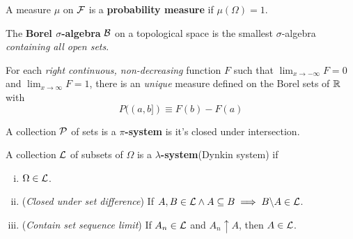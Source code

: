 \documentclass[11pt]{article}
\begin{document}
		
		\begin{definition}
			A measure $\mu$ on $\mathcal{{F}}$ is a \textbf{probability measure} if $\mu(\Omega) = 1$.
		\end{definition}
		
		\begin{definition}
			The \textbf{Borel $\sigma$-algebra} $\mathcal{{B}}$ on a topological space is the smallest $\sigma$-algebra \emph{containing all open sets}.
		\end{definition}
		
		\begin{theorem}
			For each \emph{right continuous, non-decreasing} function $F$ such that $\lim_{x \to -\infty} F = 0$ and $\lim_{x \to \infty} F = 1$, there is an \emph{unique} measure defined on the Borel sets of $\mathbb{R}$ with 
			\begin{equation}
				P((a,b]) \equiv F(b) - F(a)
			\end{equation}
		\end{theorem}
		
		\begin{definition}
			A collection $\mathcal{{P}}$ of sets is a \textbf{$\pi$-system} is it's closed under intersection.
		\end{definition}
		
		\begin{definition}
			A collection $\mathcal{{L}}$ of subsets of $\Omega$ is a \textbf{$\lambda$-system}(Dynkin system) if
			\begin{enumerate}[(i)]
				\item $\Omega \in \mathcal{{L}}$.
				\item (\emph{Closed under set difference}) If $A, B \in \mathcal{{L}} \land A \subseteq B \implies B \backslash A \in \mathcal{{L}}$.
				\item (\emph{Contain set sequence limit}) If $A_n \in \mathcal{{L}}$ and $A_n \uparrow A$, then $A \in \mathcal{{L}}$.
			\end{enumerate}
		\end{definition}
		
\end{document}

